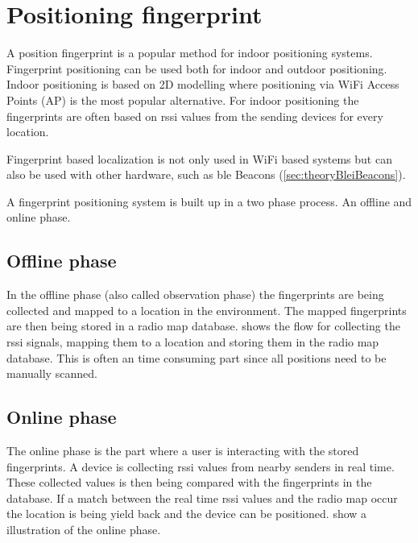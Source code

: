 \section{Positioning fingerprint}\label{sec:theoryFingerprint} A position fingerprint is a popular method for indoor positioning systems. 
Fingerprint positioning can be used both for indoor and outdoor positioning.
Indoor positioning is based on 2D modelling where positioning via WiFi Access Points (AP) is the most popular alternative.
For indoor positioning the fingerprints are often based on \acrshort{rssi} values from the sending devices for every location.
\cite{LocationFingerprintingInfrastructure2004,
IndoorFingerprintPositioning2017}

\bigskip

Fingerprint based localization is not only used in WiFi based systems but can
also be used with other hardware, such as \acrshort{ble} Beacons (\cref{sec:theoryBleiBeacons}).
\cite{PracticalFingerprintingLocalization2017} 

\bigskip

A fingerprint positioning system is built up in a two phase process.  An offline
and online phase.\cite{IndoorFingerprintPositioning2017} 

\subsection{Offline phase}\label{sec:theoryFingerprintOffline} In the offline
phase (also called observation phase) the fingerprints are being collected and
mapped to a location in the environment.
The mapped fingerprints are then being stored in a radio map database.
 shows the flow for collecting the \acrshort{rssi} signals, mapping them to a location and storing them in the radio map database.  This is often an time consuming part since all positions need to be manually
scanned.\cite{IndoorFingerprintPositioning2017} 




\subsection{Online phase}\label{sec:theoryFingerprintOnline} The online phase
is the part where a user is interacting with the stored fingerprints.
A device is collecting \acrshort{rssi} values from nearby senders in real time.
These collected values is then being compared with the fingerprints in the database.
If a match between the real time \acrshort{rssi} values and the radio map occur the location is being yield back and the device can be positioned.
 show a illustration of the
online phase.
\cite{IndoorFingerprintPositioning2017}


